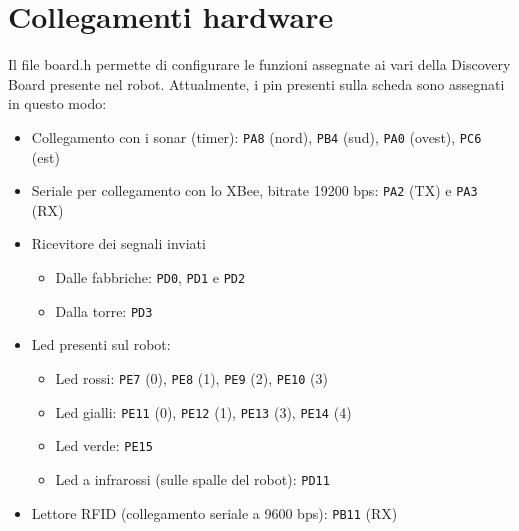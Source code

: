 \section{Collegamenti hardware}
Il file board.h permette di configurare le funzioni assegnate ai vari della Discovery Board presente nel robot. Attualmente, i pin presenti sulla scheda sono assegnati in questo modo:
\begin{itemize}
\item Collegamento con i sonar (timer): \verb|PA8| (nord), \verb|PB4| (sud), \verb|PA0| (ovest), \verb|PC6| (est)
\item Seriale per collegamento con lo XBee, bitrate 19200 bps: \verb|PA2| (TX) e \verb|PA3| (RX)
\item Ricevitore dei segnali inviati
	\begin{itemize}
	\item Dalle fabbriche: \verb|PD0|, \verb|PD1| e \verb|PD2|
	\item Dalla torre: \verb|PD3|
	\end{itemize}
\item Led presenti sul robot:
	\begin{itemize}
	\item Led rossi: \verb|PE7| (0), \verb|PE8| (1), \verb|PE9| (2), \verb|PE10| (3)
	\item Led gialli: \verb|PE11| (0), \verb|PE12| (1), \verb|PE13| (3), \verb|PE14| (4)
	\item Led verde: \verb|PE15|
	\item Led a infrarossi (sulle spalle del robot): \verb|PD11|
	\end{itemize}
\item Lettore RFID (collegamento seriale a 9600 bps): \verb|PB11| (RX)
\end{itemize}